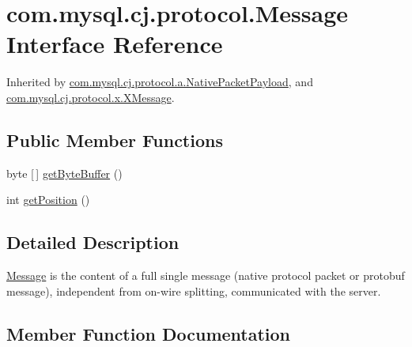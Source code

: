 \hypertarget{interfacecom_1_1mysql_1_1cj_1_1protocol_1_1_message}{}\section{com.\+mysql.\+cj.\+protocol.\+Message Interface Reference}
\label{interfacecom_1_1mysql_1_1cj_1_1protocol_1_1_message}


Inherited by \mbox{\hyperlink{classcom_1_1mysql_1_1cj_1_1protocol_1_1a_1_1_native_packet_payload}{com.\+mysql.\+cj.\+protocol.\+a.\+Native\+Packet\+Payload}}, and \mbox{\hyperlink{classcom_1_1mysql_1_1cj_1_1protocol_1_1x_1_1_x_message}{com.\+mysql.\+cj.\+protocol.\+x.\+X\+Message}}.

\subsection*{Public Member Functions}
\begin{DoxyCompactItemize}
\item 
byte \mbox{[}$\,$\mbox{]} \mbox{\hyperlink{interfacecom_1_1mysql_1_1cj_1_1protocol_1_1_message_a853af9bf4f09a55058141c7b041a8815}{get\+Byte\+Buffer}} ()
\item 
int \mbox{\hyperlink{interfacecom_1_1mysql_1_1cj_1_1protocol_1_1_message_a87a2626f6e5aceccffe224bcaf0e126b}{get\+Position}} ()
\end{DoxyCompactItemize}


\subsection{Detailed Description}
\mbox{\hyperlink{interfacecom_1_1mysql_1_1cj_1_1protocol_1_1_message}{Message}} is the content of a full single message (native protocol packet or protobuf message), independent from on-\/wire splitting, communicated with the server. 

\subsection{Member Function Documentation}
\mbox{\label{interfacecom_1_1mysql_1_1cj_1_1protocol_1_1_message_a853af9bf4f09a55058141c7b041a8815}} 
